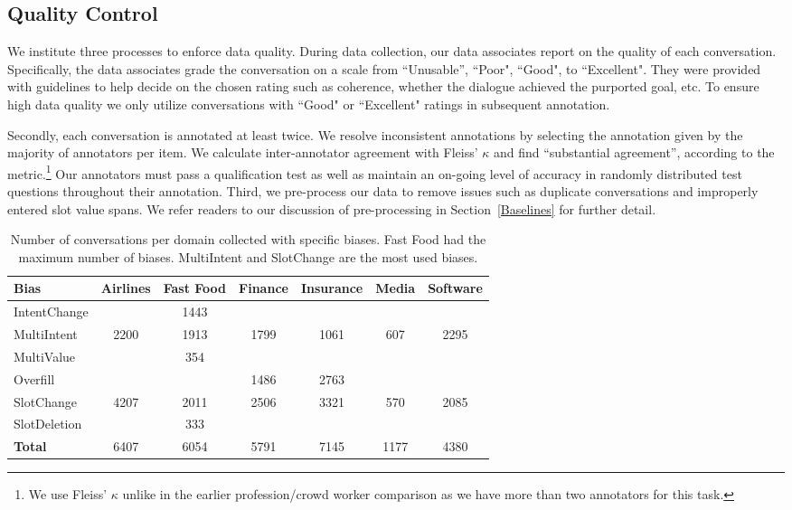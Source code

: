{{\subsection{Quality Control}\label{QC}
We institute three processes to enforce data quality.
During data collection, our data associates report on the quality of each conversation.
Specifically, the data associates grade the conversation on a scale from ``Unusable'', ``Poor", ``Good", to ``Excellent". They were provided with guidelines to help decide on the chosen rating such as coherence, whether the dialogue achieved the purported goal, etc.   To ensure high data quality we only utilize conversations with  ``Good" or ``Excellent" ratings in subsequent annotation. 

Secondly, each conversation is annotated at least twice. 
%
We resolve inconsistent annotations by selecting the annotation given by the majority of annotators per item. 
%
We calculate inter-annotator agreement with Fleiss' $\kappa$ and find ``substantial agreement'', according to the metric.\footnote{We use Fleiss' $\kappa$ unlike in the earlier profession/crowd worker comparison as we have more than two annotators for this task.}
%
Our annotators must pass a qualification test as well as maintain an on-going level of accuracy in randomly distributed test questions throughout their annotation. 
%
Third, we pre-process our data to remove issues such as duplicate conversations and improperly entered slot value spans. We refer readers to our discussion of pre-processing in Section~\ref{Baselines} for further detail.


\begin{table*}[t!]
	\centering
	\small
	\begin{tabular}{ l  c c c c c c}
		\textbf{Bias}& \textbf{Airlines} & \textbf{Fast Food}& \textbf{Finance} &\textbf{Insurance} & \textbf{Media}& \textbf{Software} \\
		\hline
		IntentChange & & 1443 & & & & \\
		MultiIntent & 2200 & 1913 & 1799 & 1061 & 607 & 2295 \\
		MultiValue & & 354& & & & \\
		Overfill & & & 1486 & 2763 & & \\
		SlotChange & 4207 & 2011& 2506 & 3321& 570 & 2085 \\
		SlotDeletion & & 333 & & & & \\
		\hline
		\textbf{Total} &6407 &6054 & 5791&7145 &1177 & 4380\\
		\hline
	\end{tabular}
	\caption{Number of conversations per domain collected with specific biases. Fast Food had the maximum number of biases. MultiIntent and SlotChange are the most used biases.} 
	\label{biases}
\end{table*}

}}
